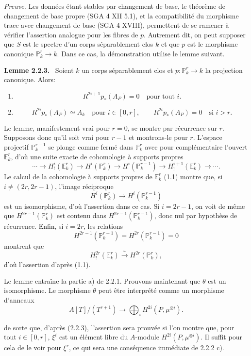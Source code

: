 \documentclass[11pt]{article}
\newenvironment{statement}[1]{\par\medskip\noindent\textbf{#1.}\ }{\par\medskip}
\begin{document}
\emph{Preuve.} Les données étant stables par changement de base, le théorème de changement de base propre (SGA 4 XII 5.1), et la compatibilité du morphisme trace avec changement de base (SGA 4 XVIII), permettent de se ramener à vérifier l'assertion analogue pour les fibres de $p$. Autrement dit, on peut supposer que $S$ est le spectre d'un corps séparablement clos $k$ et que $p$ est le morphisme canonique $\mathbb P^r_k\to k$. Dans ce cas, la démonstration utilise le lemme suivant.

\begin{statement}{Lemme 2.2.3}
Soient $k$ un corps séparablement clos et $p:\mathbb P_k^r\to k$ la projection canonique. Alors:
\begin{enumerate}[label=\alph*)]
\item
\[
R^{2i+1}p_*(A_P)=0\quad\text{pour tout }i.
\]
\item
\[
R^{2i}p_*(A_P)\simeq A_k\quad\text{pour }i\in[0,r],
\qquad
R^{2i}p_*(A_P)=0\quad\text{si }i>r.
\]
\end{enumerate}
\end{statement}

Le lemme, manifestement vrai pour $r=0$, se montre par récurrence sur $r$. Supposons donc qu'il soit vrai pour $r-1$ et montrons-le pour $r$. L'espace projectif $\mathbb P_k^{r-1}$ se plonge comme fermé dans $\mathbb P_k^r$ avec pour complémentaire l'ouvert $\mathbb E_k^r$, d'où une suite exacte de cohomologie à supports propres
\[
\cdots\longrightarrow H_!^i(\mathbb E_k^r)\longrightarrow H^i(\mathbb P_k^r)
\longrightarrow H^i(\mathbb P_k^{r-1})\longrightarrow H_!^{i+1}(\mathbb E_k^r)\longrightarrow\cdots.
\]
Le calcul de la cohomologie à supports propres de $\mathbb E_k^r$ (1.1) montre que, si $i\ne(2r,2r-1)$, l'image réciproque
\[
H^i(\mathbb P_k^r)\longrightarrow H^i(\mathbb P_k^{r-1})
\]
est un isomorphisme, d'où l'assertion dans ce cas. Si $i=2r-1$, on voit de même que $H^{2r-1}(\mathbb P_k^r)$ est contenu dans $H^{2r-1}(\mathbb P_k^{r-1})$, donc nul par hypothèse de récurrence. Enfin, si $i=2r$, les relations
\[
H^{2r-1}(\mathbb P_k^{r-1})=H^{2r}(\mathbb P_k^{r-1})=0
\]
montrent que
\[
H_!^{2r}(\mathbb E_k^r)\xrightarrow{\sim}H^{2r}(\mathbb P_k^r),
\]
d'où l'assertion d'après (1.1).

Le lemme entraîne la partie a) de 2.2.1. Prouvons maintenant que $\theta$ est un isomorphisme. Le morphisme $\theta$ peut être interprété comme un morphisme d'anneaux
\[
A[T]/(T^{r+1})\longrightarrow\bigoplus_i H^{2i}(P,\mu^{\otimes i}).
\]


de sorte que, d'après (2.2.3), l'assertion sera prouvée si l'on montre que, pour tout $i\in[0,r]$, $\xi^i$ est un élément libre du $A$-module $H^{2i}(P,\mu^{\otimes i})$. Il suffit pour cela de le voir pour $\xi^r$, ce qui sera une conséquence immédiate de 2.2.2 c).
\end{document}

